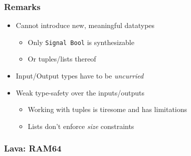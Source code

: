         \begin{frame}
            \frametitle{Remarks}

            \begin{itemize}
                \item Cannot introduce new, meaningful datatypes
                    \begin{itemize}
                        \item Only \texttt{Signal Bool} is synthesizable
                        \item Or tuples/lists thereof
                    \end{itemize}
                \item Input/Output types have to be \emph{uncurried}
                \item Weak type-safety over the inputs/outputs
                    \begin{itemize}
                        \item Working with tuples is tiresome and has limitations
                        \item Lists don't enforce \emph{size} constraints
                    \end{itemize}
            \end{itemize}

        \end{frame}

        \begin{frame}
            \frametitle{Lava: RAM64}
        \end{frame}

